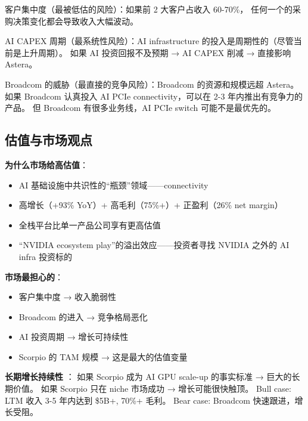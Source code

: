 客户集中度（最被低估的风险）：如果前 2 大客户占收入 60-70\%，
任何一个的采购决策变化都会导致收入大幅波动。

AI CAPEX 周期（最系统性风险）：AI infrastructure 的投入是周期性的（尽管当前是上升周期）。
如果 AI 投资回报不及预期 → AI CAPEX 削减 → 直接影响 Astera。

Broadcom 的威胁（最直接的竞争风险）：Broadcom 的资源和规模远超 Astera。
如果 Broadcom 认真投入 AI PCIe connectivity，可以在 2-3 年内推出有竞争力的产品。
但 Broadcom 有很多业务线，AI PCIe switch 可能不是最优先的。

\subsection{估值与市场观点}

\textbf{为什么市场给高估值}：
\begin{itemize}
    \item AI 基础设施中共识性的``瓶颈''领域——connectivity
    \item 高增长（+93\% YoY）+ 高毛利（75\%+）+ 正盈利（26\% net margin）
    \item 全栈平台比单一产品公司享有更高估值
    \item ``NVIDIA ecosystem play''的溢出效应——投资者寻找 NVIDIA 之外的 AI infra 投资标的
\end{itemize}

\textbf{市场最担心的}：
\begin{itemize}
    \item 客户集中度 → 收入脆弱性
    \item Broadcom 的进入 → 竞争格局恶化
    \item AI 投资周期 → 增长可持续性
    \item Scorpio 的 TAM 规模 → 这是最大的估值变量
\end{itemize}

\textbf{长期增长持续性} \speculation{}：
如果 Scorpio 成为 AI GPU scale-up 的事实标准 → 巨大的长期价值。
如果 Scorpio 只在 niche 市场成功 → 增长可能很快触顶。
Bull case: LTM 收入 3-5 年内达到 \$5B+, 70\%+ 毛利。
Bear case: Broadcom 快速跟进，增长受阻。
